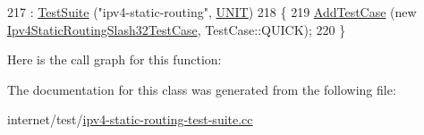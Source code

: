 \begin{DoxyCode}
217   : \hyperlink{classns3_1_1TestSuite_a904b0c40583b744d30908aeb94636d1a}{TestSuite} (\textcolor{stringliteral}{"ipv4-static-routing"}, \hyperlink{classns3_1_1TestSuite_a1ebfcab34ec8161e085e8e3a1855eae0a3885375a3787abf60431f8454b3cadbd}{UNIT})
218 \{
219   \hyperlink{classns3_1_1TestCase_a3718088e3eefd5d6454569d2e0ddd835}{AddTestCase} (\textcolor{keyword}{new} \hyperlink{classIpv4StaticRoutingSlash32TestCase}{Ipv4StaticRoutingSlash32TestCase}, 
      TestCase::QUICK);
220 \}
\end{DoxyCode}


Here is the call graph for this function\+:




The documentation for this class was generated from the following file\+:\begin{DoxyCompactItemize}
\item 
internet/test/\hyperlink{ipv4-static-routing-test-suite_8cc}{ipv4-\/static-\/routing-\/test-\/suite.\+cc}\end{DoxyCompactItemize}
